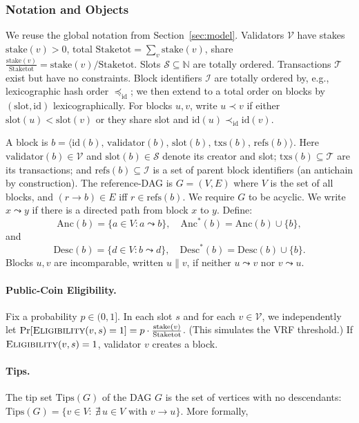 \documentclass[11pt]{article}
\newcommand{\Val}{\ensuremath{\mathcal{V}}\xspace}
\newcommand{\Slot}{\ensuremath{\mathcal{S}}\xspace}
\newcommand{\Tx}{\ensuremath{\mathcal{T}}\xspace}
\newcommand{\Id}{\ensuremath{\mathcal{I}}\xspace}
\newcommand{\stake}{\ensuremath{\mathrm{stake}}\xspace}
\newcommand{\StakeTot}{\ensuremath{\mathrm{Stake}{\mathrm{tot}}}\xspace}
\newcommand{\stakefrac}[1]{\ensuremath{\frac{\stake(#1)}{\StakeTot}}\xspace}
\newcommand{\id}{\ensuremath{\mathrm{id}}\xspace}
\newcommand{\val}{\ensuremath{\mathrm{validator}}\xspace}
\newcommand{\slot}{\ensuremath{\mathrm{slot}}\xspace}
\newcommand{\txs}{\ensuremath{\mathrm{txs}}\xspace}
\newcommand{\refs}{\ensuremath{\mathrm{refs}}\xspace}
\newcommand{\Anc}{\ensuremath{\mathrm{Anc}}\xspace}
\newcommand{\Desc}{\ensuremath{\mathrm{Desc}}\xspace}
\newcommand{\Tips}{\ensuremath{\mathrm{Tips}}\xspace}
\newcommand{\Eligibility}{\ensuremath{\textsc{Eligibility}}\xspace}
\begin{document}
\subsubsection{Notation and Objects}
\label{subsec:ideal-notation}
We reuse the global notation from Section~\ref{sec:model}. Validators $\Val$ have stakes $\stake(v)>0$, total $\StakeTot=\sum_{v}\stake(v)$, share $\stakefrac{v} = \stake(v)/\StakeTot$. Slots $\Slot\subseteq\mathbb{N}$ are totally ordered. Transactions $\Tx$ exist but have no constraints. Block identifiers $\Id$ are totally ordered by, e.g., lexicographic hash order $\preceq_{\mathrm{id}}$; we then extend to a total order on blocks by $(\slot,\id)$ lexicographically. For blocks $u,v$, write $u \prec v$ if either $\slot(u)<\slot(v)$ or they share slot and $\id(u)\prec_{\mathrm{id}}\id(v)$.

A block is $b=\langle \id(b),\,\val(b),\,\slot(b),\,\txs(b),\,\refs(b)\rangle$. Here $\val(b)\in\Val$ and $\slot(b)\in\Slot$ denote its creator and slot; $\txs(b)\subseteq\Tx$ are its transactions; and $\refs(b)\subseteq\Id$ is a set of parent block identifiers (an antichain by construction). The reference-DAG is $G=(V,E)$ where $V$ is the set of all blocks, and $(r\to b)\in E$ iff $r\in \refs(b)$. We require $G$ to be acyclic. We write $x\leadsto y$ if there is a directed path from block $x$ to $y$. Define:
\begin{equation*}
\Anc(b)=\{a\in V: a\leadsto b\},\quad \Anc^*(b)=\Anc(b)\cup\{b\},
\end{equation*}
and 
\begin{equation*}
\Desc(b)=\{d\in V: b\leadsto d\},\quad \Desc^*(b)=\Desc(b)\cup\{b\}.
\end{equation*}
Blocks $u,v$ are incomparable, written $u\parallel v$, if neither $u\leadsto v$ nor $v\leadsto u$.

\paragraph{Public-Coin Eligibility.} Fix a probability $p\in(0,1]$. In each slot $s$ and for each $v\in\Val$, we independently let $\Pr[\Eligibility(v,s)=1] = p\cdot \stakefrac{v}$. (This simulates the VRF threshold.) If $\Eligibility(v,s)=1$, validator $v$ creates a block.

\paragraph{Tips.} The tip set $\Tips(G)$ of the DAG $G$ is the set of vertices with no descendants: $\Tips(G)=\{v\in V:\ \nexists\,u\in V \text{ with } v\to u\}$. More formally, 
\end{document}
